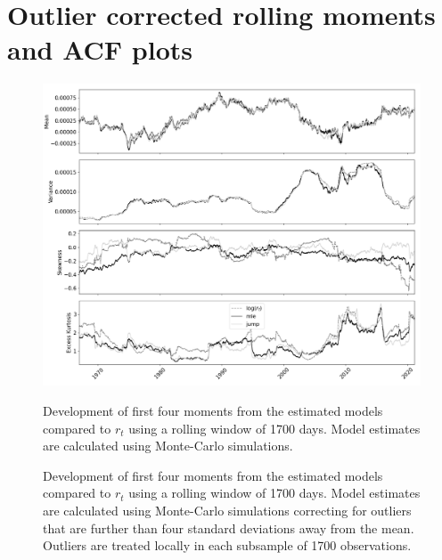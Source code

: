 \section{Outlier corrected rolling moments and ACF plots}

\begin{figure}[H] 
    \centering
    \includegraphics[width=1.0\textwidth]{analysis/stylized_facts/images/moments_outlier_corrected.png}
    
    
    \caption[Development of the first four moments from the estimated models and $r_t$]{Development of first four moments from the estimated models compared to $r_t$ using a rolling window of 1700 days. Model estimates are calculated using Monte-Carlo simulations.}
    
    \caption[Development of the first four moments from the outlier corrected estimated models and $r_t$]{Development of first four moments from the estimated models compared to $r_t$ using a rolling window of 1700 days. Model estimates are calculated using Monte-Carlo simulations correcting for outliers that are further than four standard deviations away from the mean. Outliers are treated locally in each subsample of 1700 observations.}
\label{fig:stylized_facts_rolling_moments_outliers_appendix}
\end{figure}

